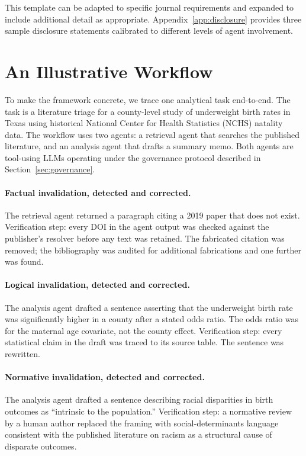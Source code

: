 \documentclass[11pt,letterpaper]{article}
\begin{document}
This template can be adapted to specific journal requirements and expanded to include additional detail as appropriate. Appendix~\ref{app:disclosure} provides three sample disclosure statements calibrated to different levels of agent involvement.

\section{An Illustrative Workflow}
\label{sec:workflow}

To make the framework concrete, we trace one analytical task end-to-end. The task is a literature triage for a county-level study of underweight birth rates in Texas using historical National Center for Health Statistics (NCHS) natality data. The workflow uses two agents: a retrieval agent that searches the published literature, and an analysis agent that drafts a summary memo. Both agents are tool-using LLMs operating under the governance protocol described in Section~\ref{sec:governance}.

\paragraph{Factual invalidation, detected and corrected.} The retrieval agent returned a paragraph citing a 2019 paper that does not exist. Verification step: every DOI in the agent output was checked against the publisher's resolver before any text was retained. The fabricated citation was removed; the bibliography was audited for additional fabrications and one further was found.

\paragraph{Logical invalidation, detected and corrected.} The analysis agent drafted a sentence asserting that the underweight birth rate was significantly higher in a county after a stated odds ratio. The odds ratio was for the maternal age covariate, not the county effect. Verification step: every statistical claim in the draft was traced to its source table. The sentence was rewritten.

\paragraph{Normative invalidation, detected and corrected.} The analysis agent drafted a sentence describing racial disparities in birth outcomes as ``intrinsic to the population.'' Verification step: a normative review by a human author replaced the framing with social-determinants language consistent with the published literature on racism as a structural cause of disparate outcomes.
\end{document}
